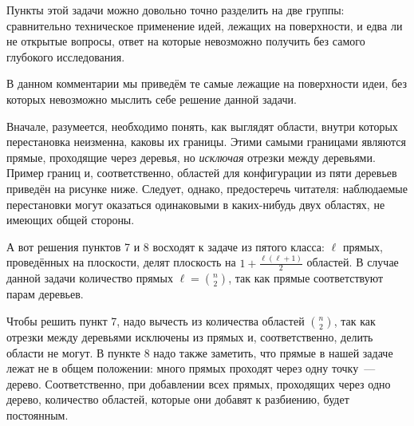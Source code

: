 \documentclass[a4paper,11pt]{article}
\begin{document}
Пункты этой задачи можно довольно точно разделить на две группы: сравнительно техническое применение идей, лежащих на поверхности, и едва ли не открытые вопросы, ответ на которые невозможно получить без самого глубокого исследования.

В данном комментарии мы приведём те самые лежащие на поверхности идеи, без которых невозможно мыслить себе решение данной задачи.

Вначале, разумеется, необходимо понять, как выглядят области, внутри которых перестановка неизменна, каковы их границы. Этими самыми границами являются прямые, проходящие через деревья, но {\itshape исключая} отрезки между деревьями. Пример границ и, соответственно, областей для конфигурации из пяти деревьев приведён на рисунке ниже. Следует, однако, предостеречь читателя: наблюдаемые перестановки могут оказаться одинаковыми в каких-нибудь двух областях, не имеющих общей стороны.

\begin{figure}[ht] \centering {} \end{figure}

А вот решения пунктов 7 и 8 восходят к задаче из пятого класса: \( \ell \) прямых, проведённых на плоскости, делят плоскость на \( 1 + \frac{\ell (\ell + 1)}{2} \) областей. В случае данной задачи количество прямых \( \ell = \binom{n}{2} \), так как прямые соответствуют парам деревьев.

Чтобы решить пункт 7, надо вычесть из количества областей \( \binom{n}{2} \), так как отрезки между деревьями исключены из прямых и, соответственно, делить области не могут. В пункте 8 надо также заметить, что прямые в нашей задаче лежат не в общем положении: много прямых проходят через одну точку~— дерево. Соответственно, при добавлении всех прямых, проходящих через одно дерево, количество областей, которые они добавят к разбиению, будет постоянным.
\end{document}
